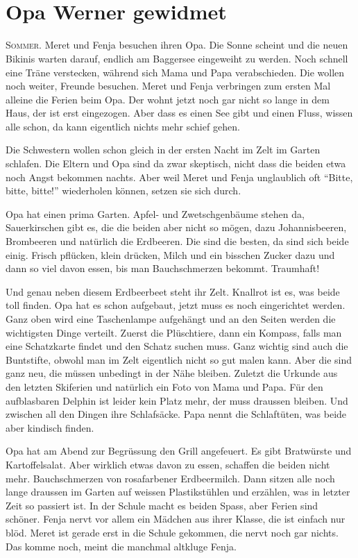 \chapter*{{}\\\small \color{DeepPink} Opa Werner gewidmet}
\lettrine[lines=3]{\color{DeepPink}S}{ommer.} Meret und Fenja besuchen ihren Opa. Die Sonne scheint und die neuen Bikinis warten darauf, endlich am Baggersee eingeweiht zu werden. Noch schnell eine Träne verstecken, während sich Mama und Papa verabschieden. Die wollen noch weiter, Freunde besuchen. Meret und Fenja verbringen zum ersten Mal alleine die Ferien beim Opa. Der wohnt jetzt noch gar nicht so lange in dem Haus, der ist erst eingezogen. Aber dass es einen See gibt und einen Fluss, wissen alle schon, da kann eigentlich nichts mehr schief gehen.

Die Schwestern wollen schon gleich in der ersten Nacht im Zelt im Garten schlafen. Die Eltern und Opa sind da zwar skeptisch, nicht dass die beiden etwa noch Angst bekommen nachts. Aber weil Meret und Fenja unglaublich oft \enquote{Bitte, bitte, bitte!} wiederholen können, setzen sie sich durch.

Opa hat einen prima Garten. Apfel- und Zwetschgenbäume stehen da, Sauerkirschen gibt es, die die beiden aber nicht so mögen, dazu Johannisbeeren, Brombeeren und natürlich die Erdbeeren. Die sind die besten, da sind sich beide einig. Frisch pflücken, klein drücken, Milch und ein bisschen Zucker dazu und dann so viel davon essen, bis man Bauchschmerzen bekommt. Traumhaft!

Und genau neben diesem Erdbeerbeet steht ihr Zelt. Knallrot ist es, was beide toll finden. Opa hat es schon aufgebaut, jetzt muss es noch eingerichtet werden. Ganz oben wird eine Taschenlampe aufgehängt und an den Seiten werden die wichtigsten Dinge verteilt. Zuerst die Plüschtiere, dann ein Kompass, falls man eine Schatzkarte findet und den Schatz suchen muss. Ganz wichtig sind auch die Buntstifte, obwohl man im Zelt eigentlich nicht so gut malen kann. Aber die sind ganz neu, die müssen unbedingt in der Nähe bleiben. Zuletzt die Urkunde aus den letzten Skiferien und natürlich ein Foto von Mama und Papa. Für den aufblasbaren Delphin ist leider kein Platz mehr, der muss draussen bleiben. Und zwischen all den Dingen ihre Schlafsäcke. Papa nennt die Schlaftüten, was beide aber kindisch finden.

Opa hat am Abend zur Begrüssung den Grill angefeuert. Es gibt Bratwürste und Kartoffelsalat. Aber wirklich etwas davon zu essen, schaffen die beiden nicht mehr. Bauchschmerzen von rosafarbener Erdbeermilch. Dann sitzen alle noch lange draussen im Garten auf weissen Plastikstühlen und erzählen, was in letzter Zeit so passiert ist. In der Schule macht es beiden Spass, aber Ferien sind schöner. Fenja nervt vor allem ein Mädchen aus ihrer Klasse, die ist einfach nur blöd. Meret ist gerade erst in die Schule gekommen, die nervt noch gar nichts. Das komme noch, meint die manchmal altkluge Fenja.

